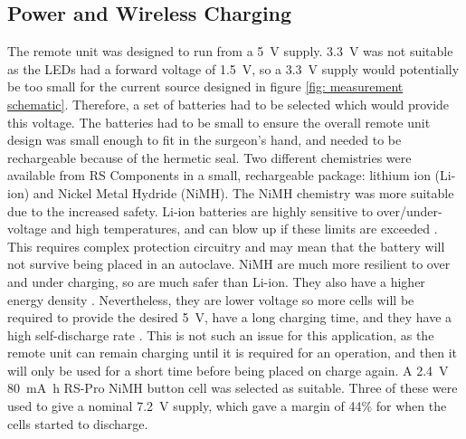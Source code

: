 \subsection{Power and Wireless Charging}
The remote unit was designed to run from a \SI{5}{\volt} supply. \SI{3.3}{\volt} was not suitable as the LEDs had a forward voltage of \SI{1.5}{\volt}, so a \SI{3.3}{\volt} supply would potentially be too small for the current source designed in figure \ref{fig: measurement schematic}. Therefore, a set of batteries had to be selected which would provide this voltage. The batteries had to be small to ensure the overall remote unit design was small enough to fit in the surgeon's hand, and needed to be rechargeable because of the hermetic seal. Two different chemistries were available from RS Components \cite{rs} in a small, rechargeable package: lithium ion (Li-ion) and Nickel Metal Hydride (NiMH). The NiMH chemistry was more suitable due to the increased safety. Li-ion batteries are highly sensitive to over/under-voltage and high temperatures, and can blow up if these limits are exceeded \cite{batteries}. This requires complex protection circuitry and may mean that the battery will not survive being placed in an autoclave. NiMH are much more resilient to over and under charging, so are much safer than Li-ion. They also have a higher energy density \cite{batteries}. Nevertheless, they are lower voltage so more cells will be required to provide the desired \SI{5}{\volt}, have a long charging time, and they have a high self-discharge rate \cite{batteries}. This is not such an issue for this application, as the remote unit can remain charging until it is required for an operation, and then it will only be used for a short time before being placed on charge again. A \SI{2.4}{\volt} \SI{80}{\milli\ampere\hour} RS-Pro NiMH button cell \cite{rs_pro_batteries} was selected as suitable. Three of these were used to give a nominal \SI{7.2}{\volt} supply, which gave a margin of 44\% for when the cells started to discharge.\\

